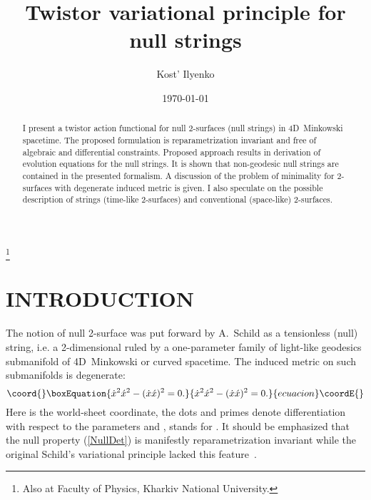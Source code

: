 \documentclass[a4paper,twocolumn,showkeys,showpacs,aps]{revtex4}
\begin{document}
\title{Twistor variational principle for null strings}
\author{Kost' Ilyenko}
 \thanks{Also at Faculty of Physics, Kharkiv National University.}%
%
\date{\today}%
\begin{abstract}
I present a twistor action functional for null 2-surfaces (null
strings) in 4D~Minkowski spacetime. The proposed formulation is
reparametrization  invariant and free of algebraic and
differential constraints. Proposed approach results in derivation
of evolution equations for the null strings. It is shown that
non-geodesic null strings are contained in the presented
formalism. A discussion of the problem of minimality for
2-surfaces with degenerate induced metric is given. I also
speculate on the possible description of strings (time-like
2-surfaces) and conventional (space-like) 2-surfaces.%
\end{abstract}
%
%
\maketitle

\section{INTRODUCTION}

The notion of null 2-surface was put forward by A.~Schild as a
tensionless (null) string, i.e. a 2-dimensional ruled by a
one-parameter family of light-like geodesics submanifold of
4D~Minkowski or curved spacetime. The induced metric on such
submanifolds is degenerate:
\begin{equation}\coord{}\boxEquation{
\dot{x}^2\acute{x}^2 - (\dot{x}\acute{x})^2 = 0.
\label{NullDet}
}{
\dot{x}^2\acute{x}^2 - (\dot{x}\acute{x})^2 = 0.
}{ecuacion}\coordE{}\end{equation}
Here \coordHE{} is the world-sheet coordinate, the dots
and primes denote differentiation with respect to the parameters
\myHighlight{$\tau$}\coordHE{} and \myHighlight{$\sigma$}\coordHE{}, \coordHE{} stands for
\coordHE{}. It should be emphasized that the null
property (\ref{NullDet}) is manifestly reparametrization invariant
while the original Schild's variational principle lacked this
feature~\cite{Schild}.
\end{document}
